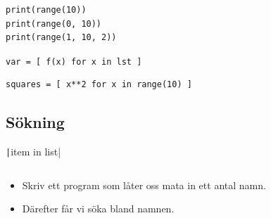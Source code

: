 \begin{frame}[fragile]
  \begin{example}
    \begin{verbatim}
print(range(10))
print(range(0, 10))
print(range(1, 10, 2))
    \end{verbatim}
  \end{example}
\end{frame}

\begin{frame}[fragile]
  \texttt{var = [ f(x) for x in lst ]}
\end{frame}

\begin{frame}[fragile]
  \begin{example}
    \begin{verbatim}
squares = [ x**2 for x in range(10) ]
    \end{verbatim}
  \end{example}
\end{frame}


\subsection{Sökning}

\begin{frame}[fragile]
  \texttt|item in list|
\end{frame}

\begin{frame}[fragile]
  \begin{example}[isin.py]
    \inputminted{python}{examples/isin.py}
  \end{example}
\end{frame}

\begin{frame}[fragile]
  \begin{exercise}[search.py]
    \begin{itemize}
      \item Skriv ett program som låter oss mata in ett antal 
        namn.
      \item Därefter får vi söka bland namnen.
    \end{itemize}
  \end{exercise}
\end{frame}


